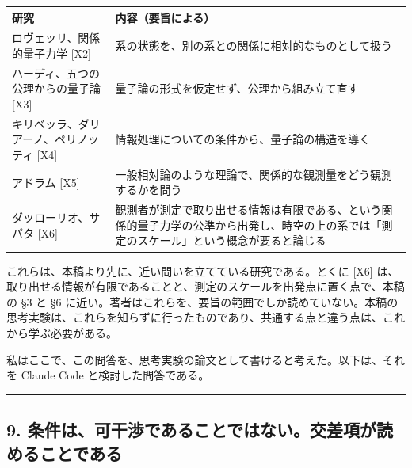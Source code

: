 \documentclass[
  a4paper,
]{ltjsarticle}
\newcounter{none} %
\begin{document}
{\def\LTcaptype{none} %
\begin{longtable}[]{@{}
  >{\raggedright\arraybackslash}p{}
  >{\raggedright\arraybackslash}p{}@{}}
\toprule\noalign{}
\begin{minipage}[b]{\linewidth}\raggedright
研究
\end{minipage} & \begin{minipage}[b]{\linewidth}\raggedright
内容（要旨による）
\end{minipage} \\
\midrule\noalign{}
\endhead
\bottomrule\noalign{}
\endlastfoot
ロヴェッリ、関係的量子力学 {[}X2{]} &
系の状態を、別の系との関係に相対的なものとして扱う \\
ハーディ、五つの公理からの量子論 {[}X3{]} &
量子論の形式を仮定せず、公理から組み立て直す \\
キリベッラ、ダリアーノ、ペリノッティ {[}X4{]} &
情報処理についての条件から、量子論の構造を導く \\
アドラム {[}X5{]} &
一般相対論のような理論で、関係的な観測量をどう観測するかを問う \\
ダッローリオ、サパタ {[}X6{]} &
観測者が測定で取り出せる情報は有限である、という関係的量子力学の公準から出発し、時空の上の系では「測定のスケール」という概念が要ると論じる \\
\end{longtable}
}

これらは、本稿より先に、近い問いを立てている研究である。とくに {[}X6{]}
は、取り出せる情報が有限であることと、測定のスケールを出発点に置く点で、本稿の
§3 と §6
に近い。著者はこれらを、要旨の範囲でしか読めていない。本稿の思考実験は、これらを知らずに行ったものであり、共通する点と違う点は、これから学ぶ必要がある。

私はここで、この問答を、思考実験の論文として書けると考えた。以下は、それを
Claude Code と検討した問答である。

\begin{center}\rule{0.5\linewidth}{0.5pt}\end{center}

\subsection{9.
条件は、可干渉であることではない。交差項が読めることである}\label{ux6761ux4ef6ux306fux53efux5e72ux6e09ux3067ux3042ux308bux3053ux3068ux3067ux306fux306aux3044ux4ea4ux5deeux9805ux304cux8aadux3081ux308bux3053ux3068ux3067ux3042ux308b}
\end{document}
